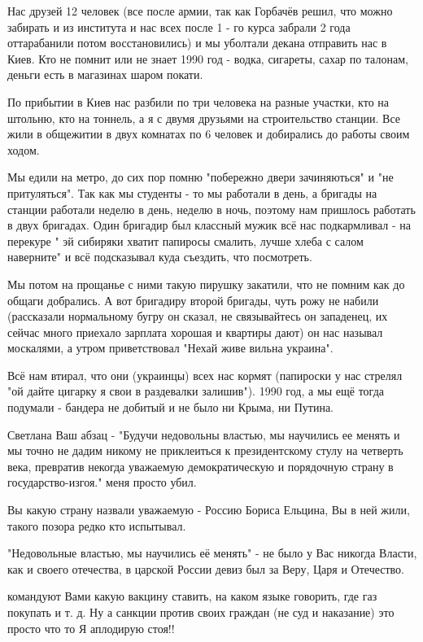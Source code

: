 \begin{itemize}
Нас друзей 12 человек (все после армии, так как Горбачёв решил, что
можно забирать и из института и нас всех после 1 - го курса забрали 2 года
оттарабанили потом восстановились) и мы уболтали декана отправить нас в Киев.
Кто не помнит или не знает 1990 год - водка, сигареты, сахар по талонам, деньги
есть в магазинах шаром покати. 

По прибытии в Киев нас разбили по три человека
на разные участки, кто на штольню, кто на тоннель, а я с двумя друзьями на
строительство станции. Все жили в общежитии в двух комнатах по 6 человек и
добирались до работы своим ходом. 

Мы едили на метро, до сих пор помню "побережно двери зачиняються" и "не
притуляться". Так как мы студенты - то мы работали в день, а бригады на станции
работали неделю в день, неделю в ночь, поэтому нам пришлось работать в двух
бригадах. Один бригадир был классный мужик всё нас подкармливал - на перекуре "
эй сибиряки хватит папиросы смалить, лучше хлеба с салом наверните" и всё
подсказывал куда съездить, что посмотреть. 

Мы потом на прощанье с ними такую пирушку закатили, что не помним как до общаги
добрались. А вот бригадиру второй бригады, чуть рожу не набили (рассказали
нормальному бугру он сказал, не связывайтесь он западенец, их сейчас много
приехало зарплата хорошая и квартиры дают) он нас называл москалями, а утром
приветствовал "Нехай живе вильна украина". 

Всё нам втирал, что они (украинцы) всех нас кормят (папироски у нас стрелял "ой
дайте цигарку я свои в раздевалки залишив"). 1990 год, а мы ещё тогда подумали
- бандера не добитый и не было ни Крыма, ни Путина. 

Светлана Ваш абзац - "Будучи недовольны властью, мы научились ее менять и мы
точно не дадим никому не приклеиться к президентскому стулу на четверть века,
превратив некогда уважаемую демократическую и порядочную страну в
государство-изгоя." меня просто убил. 

Вы какую страну назвали уважаемую - Россию Бориса Ельцина, Вы в ней жили,
такого позора редко кто испытывал.

"Недовольные властью, мы научились её менять" - не было у Вас никогда Власти,
как и своего отечества, в царской России девиз был за Веру, Царя и Отечество. 

командуют Вами какую вакцину ставить, на каком языке говорить, где газ покупать
и т. д. Ну а санкции против своих граждан (не суд и наказание) это просто что
то Я аплодирую стоя!! 


\end{itemize}
